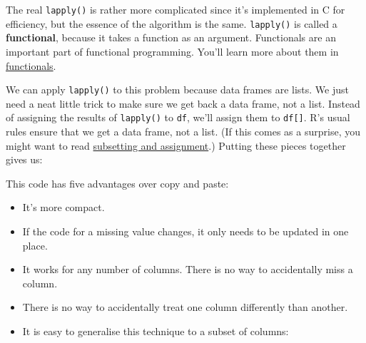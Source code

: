 The real \texttt{lapply()} is rather more complicated since it's
implemented in C for efficiency, but the essence of the algorithm is the
same. \texttt{lapply()} is called a \textbf{functional}, because it
takes a function as an argument. Functionals are an important part of
functional programming. You'll learn more about them in
\protect\hyperlink{functionals}{functionals}.

We can apply \texttt{lapply()} to this problem because data frames are
lists. We just need a neat little trick to make sure we get back a data
frame, not a list. Instead of assigning the results of \texttt{lapply()}
to \texttt{df}, we'll assign them to \texttt{df{[}{]}}. R's usual rules
ensure that we get a data frame, not a list. (If this comes as a
surprise, you might want to read
\protect\hyperlink{subassignment}{subsetting and assignment}.) Putting
these pieces together gives us:

\begin{Shaded}
\begin{Highlighting}[]
\StringTok{ }
\NormalTok{  x[x }\OperatorTok{==}\StringTok{ }\NormalTok{] <-}\StringTok{ }
\NormalTok{\}}
\StringTok{ }
\end{Highlighting}
\end{Shaded}

This code has five advantages over copy and paste:

\begin{itemize}
\item
  It's more compact.
\item
  If the code for a missing value changes, it only needs to be updated
  in one place.
\item
  It works for any number of columns. There is no way to accidentally
  miss a column.
\item
  There is no way to accidentally treat one column differently than
  another.
\item
  It is easy to generalise this technique to a subset of columns:

\begin{Shaded}
\begin{Highlighting}[]
\NormalTok{df[}\OperatorTok{:}\NormalTok{] <-}\StringTok{ }\NormalTok{(df[}\OperatorTok{:}\NormalTok{], fix_missing)}
\end{Highlighting}
\end{Shaded}
\end{itemize}

